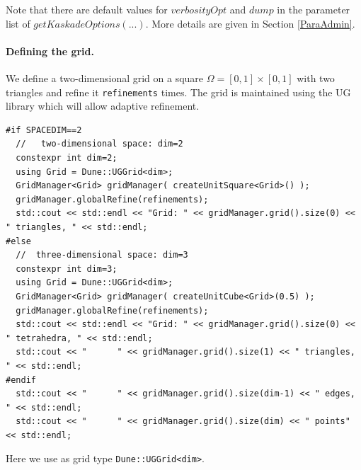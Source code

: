 \documentclass[11pt]{article}
\begin{document}
\noindent Note that there are default values for $verbosityOpt$ and  $dump$ in the parameter list of   $getKaskadeOptions(...)$. 
More details are given in Section \ref{ParaAdmin}.


\paragraph{Defining the grid.}

We define a two-dimensional grid on a square $\Omega = [0,1]\times[0,1]$ with two triangles and refine it {\tt refinements} times. 
The grid is maintained using the UG library \cite{ugPackage} which will allow adaptive refinement.\\

\begin{lstlisting}
#if SPACEDIM==2
  //   two-dimensional space: dim=2
  constexpr int dim=2;        
  using Grid = Dune::UGGrid<dim>;
  GridManager<Grid> gridManager( createUnitSquare<Grid>() );
  gridManager.globalRefine(refinements);
  std::cout << std::endl << "Grid: " << gridManager.grid().size(0) << " triangles, " << std::endl;
#else
  //  three-dimensional space: dim=3
  constexpr int dim=3; 
  using Grid = Dune::UGGrid<dim>;
  GridManager<Grid> gridManager( createUnitCube<Grid>(0.5) );
  gridManager.globalRefine(refinements);
  std::cout << std::endl << "Grid: " << gridManager.grid().size(0) << " tetrahedra, " << std::endl;
  std::cout << "      " << gridManager.grid().size(1) << " triangles, " << std::endl;
#endif
  std::cout << "      " << gridManager.grid().size(dim-1) << " edges, " << std::endl;
  std::cout << "      " << gridManager.grid().size(dim) << " points" << std::endl;
\end{lstlisting}

Here we use as grid type {\tt Dune::UGGrid<dim>}.  

\end{document}
